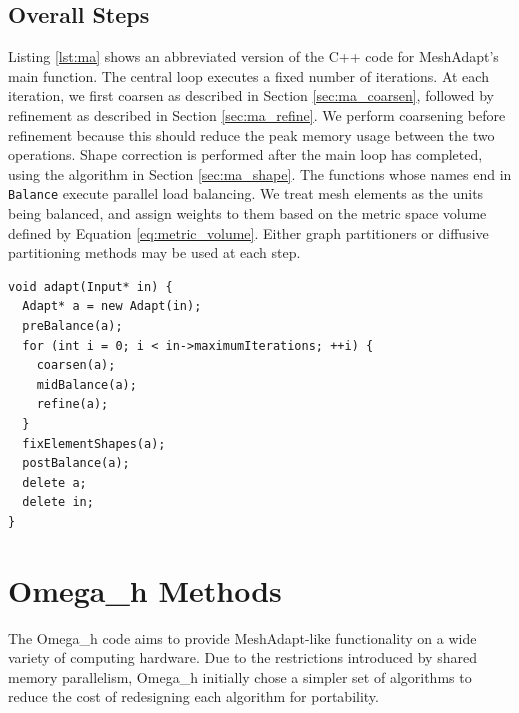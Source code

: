 \subsection{Overall Steps}

Listing \ref{lst:ma} shows an abbreviated version of the C++
code for MeshAdapt's main function.
The central loop executes a fixed number of iterations.
At each iteration, we first coarsen as described
in Section \ref{sec:ma_coarsen}, followed by refinement
as described in Section \ref{sec:ma_refine}.
We perform coarsening before refinement because this
should reduce the peak memory usage between the two
operations.
Shape correction is performed after the main loop
has completed, using the algorithm in Section \ref{sec:ma_shape}.
The functions whose names end in \texttt{Balance} execute
parallel load balancing.
We treat mesh elements as the units being balanced,
and assign weights to them based on the metric space
volume defined by Equation \ref{eq:metric_volume}.
Either graph partitioners \cite{devine2002zoltan} or
diffusive partitioning methods \cite{SmithParma2015}
may be used at each step.

\begin{lstlisting}[float,style=dan-style,caption=MeshAdapt main function,label=lst:ma]
void adapt(Input* in) {
  Adapt* a = new Adapt(in);
  preBalance(a);
  for (int i = 0; i < in->maximumIterations; ++i) {
    coarsen(a);
    midBalance(a);
    refine(a);
  }
  fixElementShapes(a);
  postBalance(a);
  delete a;
  delete in;
}
\end{lstlisting}

\section{Omega\_h Methods}
\label{sec:omega_h-adapt}

The Omega\_h code aims to provide MeshAdapt-like functionality
on a wide variety of computing hardware.
Due to the restrictions introduced by shared memory parallelism,
Omega\_h initially chose a simpler set of algorithms to reduce the
cost of redesigning each algorithm for portability.

